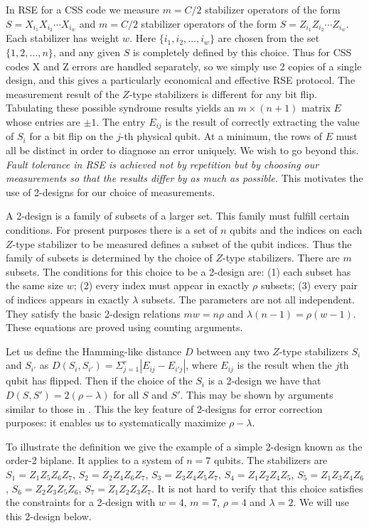 \documentclass[reprint, superscriptaddress]{revtex4-1}
\numberwithin{equation}{section}
\numberwithin{figure}{section}
\numberwithin{table}{section}
\begin{document}
In RSE for a CSS code we measure $m=C/2$ stabilizer operators of the form 
$S = X_{i_1} X_{i_2} \cdots X_{i_w}$
and $m=C/2$ stabilizer operators of the form
$S = Z_{i_1} Z_{i_2} \cdots Z_{i_w}$. Each stabilizer has weight $w$. Here $\{i_1, i_2,..., i_w\}$ are chosen from the set $\{1,2,\dots,n\}$, and any given $S$ is completely defined by this choice.   Thus for CSS codes X and Z errors are handled separately, so we simply use 2 copies of a single design, and this gives a particularly economical and effective RSE protocol. The measurement result of the $Z$-type stabilizers is different for any bit flip.  Tabulating these possible syndrome results yields an $m \times (n+1) $ matrix $E$ whose entries are $\pm 1$.  The entry $E_{ij}$ is the result of correctly extracting the value of $S_i$ for a bit flip on the $j$-th physical qubit.  At a minimum, the rows of $E$ must all be distinct in order to diagnose an error uniquely.  We wish to go beyond this.  \textit{Fault tolerance in RSE is achieved not by repetition but by choosing our measurements so that the results differ by as much as possible.} This motivates the use of 2-designs for our choice of measurements.

A 2-design is a family of subsets of a larger set.  This family must fulfill certain conditions.  For present purposes there is a set of $n$ qubits and the indices on each $Z$-type stabilizer to be measured defines a subset of the qubit indices.  Thus the family of subsets is determined by the choice of $Z$-type stabilizers.  There are $m$ subsets.  The conditions for this choice to be a 2-design are: (1) each subset has the same size $w$; (2) every index must appear in exactly $\rho$ subsets; (3) every pair of indices appears in exactly $\lambda$ subsets.  The parameters are not all independent.  They satisfy the basic 2-design relations $mw=n \rho$ and $\lambda (n-1) = \rho (w-1)$.  These equations are proved using counting arguments.  

 Let us define the Hamming-like distance $D$ between any two $Z$-type stabilizers $S_{i}$ and $S_{i'}$ as $D(S_{i},S_{i'}) = \Sigma_{j=1}^{r} |E_{ij}-E_{i'j}|$, where $E_{ij}$ is the result when the $j$th qubit has flipped.  Then if the choice of the $S_i$ is a 2-design we have that $D(S,S') =2(\rho-\lambda)$ for all $S$ and $S'$.  This may be shown by arguments similar to those in \cite{Pless}.  This the key feature of 2-designs for error correction purposes: it enables us to systematically maximize $\rho - \lambda $. 

To illustrate the definition we give the example of a simple 2-design known as the order-2 biplane.  It applies to a system of $n=7$ qubits.  The stabilizers are $S_1 = Z_1 Z_5 Z_6 Z_7$, $S_2 = Z_2 Z_4 Z_6 Z_7$, $S_3 = Z_3 Z_4 Z_5 Z_7$, $S_4 = Z_1 Z_2 Z_4 Z_5$, $S_5 = Z_1 Z_3 Z_4 Z_6$, $S_6 = Z_2 Z_3 Z_5 Z_6$, $S_7 = Z_1 Z_2 Z_3 Z_7$.  It is not hard to verify that this choice satisfies the constraints for a 2-design with $w=4$, $m=7$, $\rho = 4$ and $\lambda = 2$.  We will use this 2-design below. 
\end{document}
